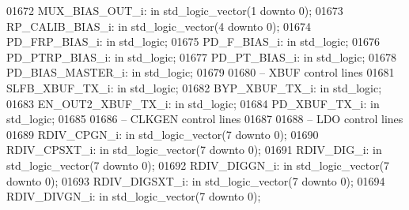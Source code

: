 \begin{DoxyCode}
01672     MUX\_BIAS\_OUT\_i: \textcolor{keywordflow}{in} \textcolor{comment}{std\_logic\_vector}(\textcolor{vhdllogic}{}\textcolor{vhdllogic}{1} \textcolor{keywordflow}{downto} \textcolor{vhdllogic}{}\textcolor{vhdllogic}{0});
01673     RP\_CALIB\_BIAS\_i:    \textcolor{keywordflow}{in} \textcolor{comment}{std\_logic\_vector}(\textcolor{vhdllogic}{}\textcolor{vhdllogic}{4} \textcolor{keywordflow}{downto} \textcolor{vhdllogic}{}\textcolor{vhdllogic}{0});
01674     PD\_FRP\_BIAS\_i:  \textcolor{keywordflow}{in} \textcolor{comment}{std\_logic};
01675     PD\_F\_BIAS\_i:    \textcolor{keywordflow}{in} \textcolor{comment}{std\_logic};
01676     PD\_PTRP\_BIAS\_i: \textcolor{keywordflow}{in} \textcolor{comment}{std\_logic};
01677     PD\_PT\_BIAS\_i:   \textcolor{keywordflow}{in} \textcolor{comment}{std\_logic};
01678     PD\_BIAS\_MASTER\_i:   \textcolor{keywordflow}{in} \textcolor{comment}{std\_logic};
01679 
01680 \textcolor{keyword}{    -- XBUF control lines}
01681     SLFB\_XBUF\_TX\_i: \textcolor{keywordflow}{in} \textcolor{comment}{std\_logic};
01682     BYP\_XBUF\_TX\_i:  \textcolor{keywordflow}{in} \textcolor{comment}{std\_logic};
01683     EN\_OUT2\_XBUF\_TX\_i:  \textcolor{keywordflow}{in} \textcolor{comment}{std\_logic};
01684     PD\_XBUF\_TX\_i:   \textcolor{keywordflow}{in} \textcolor{comment}{std\_logic};
01685 
01686 \textcolor{keyword}{    -- CLKGEN control lines }
01687         
01688 \textcolor{keyword}{    -- LDO control lines    }
01689     RDIV\_CPGN\_i:    \textcolor{keywordflow}{in} \textcolor{comment}{std\_logic\_vector}(\textcolor{vhdllogic}{}\textcolor{vhdllogic}{7} \textcolor{keywordflow}{downto} \textcolor{vhdllogic}{}\textcolor{vhdllogic}{0});
01690     RDIV\_CPSXT\_i:   \textcolor{keywordflow}{in} \textcolor{comment}{std\_logic\_vector}(\textcolor{vhdllogic}{}\textcolor{vhdllogic}{7} \textcolor{keywordflow}{downto} \textcolor{vhdllogic}{}\textcolor{vhdllogic}{0});
01691     RDIV\_DIG\_i: \textcolor{keywordflow}{in} \textcolor{comment}{std\_logic\_vector}(\textcolor{vhdllogic}{}\textcolor{vhdllogic}{7} \textcolor{keywordflow}{downto} \textcolor{vhdllogic}{}\textcolor{vhdllogic}{0});
01692     RDIV\_DIGGN\_i:   \textcolor{keywordflow}{in} \textcolor{comment}{std\_logic\_vector}(\textcolor{vhdllogic}{}\textcolor{vhdllogic}{7} \textcolor{keywordflow}{downto} \textcolor{vhdllogic}{}\textcolor{vhdllogic}{0});
01693     RDIV\_DIGSXT\_i:  \textcolor{keywordflow}{in} \textcolor{comment}{std\_logic\_vector}(\textcolor{vhdllogic}{}\textcolor{vhdllogic}{7} \textcolor{keywordflow}{downto} \textcolor{vhdllogic}{}\textcolor{vhdllogic}{0});
01694     RDIV\_DIVGN\_i:   \textcolor{keywordflow}{in} \textcolor{comment}{std\_logic\_vector}(\textcolor{vhdllogic}{}\textcolor{vhdllogic}{7} \textcolor{keywordflow}{downto} \textcolor{vhdllogic}{}\textcolor{vhdllogic}{0});

\end{DoxyCode}
